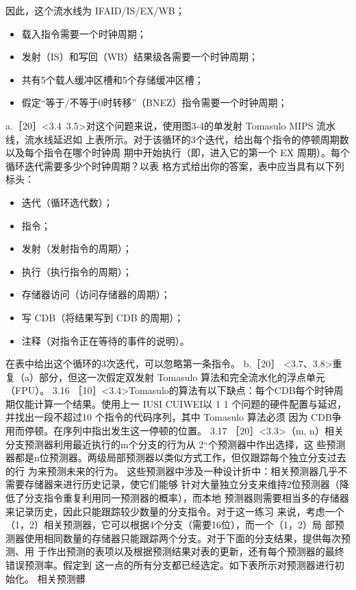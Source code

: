 因此，这个流水线为 IFAID/IS/EX/WB；
\begin{itemize}
    \item 载入指令需要一个时钟周期；
    \item 发射（IS）和写回（WB）结果级各需要一个时钟周期；
    \item 共有5个载人缓冲区槽和5个存储缓冲区槽；
    \item 假定“等于/不等于0时转移”（BNEZ）指令需要一个时钟周期；
\end{itemize}
a.［20］<3.4~3.5>对这个问题来说，使用图3-4的单发射 Tomasulo MIPS 流水线，流水线延迟如
上表所示。对于该循环的3个迭代，给出每个指令的停顿周期数以及每个指令在哪个时钟周
期中开始执行（即，进入它的第一个 EX 周期）。每个循环迭代需要多少个时钟周期？以表
格方式给出你的答案，表中应当具有以下列标头：
\begin{itemize}
    \item 迭代（循环选代数）；
    \item 指令；
    \item 发射（发射指令的周期）；
    \item 执行（执行指令的周期）；
    \item 存储器访问（访问存储器的周期）；
    \item 写 CDB（将结果写到 CDB 的周期）；
    \item 注释（对指令正在等待的事件的说明）。
\end{itemize}
在表中给出这个循环的3次迭代，可以忽略第一条指令。
b.［20］ <3.7、3.8>重复（a）部分，但这一次假定双发射 Tomasulo 算法和完全流水化的浮点单元（FPU）。
3.16 ［10］<3.4>Tomasulo的算法有以下缺点：每个CDB每个时钟周期仅能计算一个结果。使用上一
IUSI CUIWEI以
1 1
个问题的硬件配置与延迟，并找出一段不超过10 个指令的代码序列，其中 Tomasulo 算法必须
因为 CDB争用而停顿。在序列中指出发生这一停顿的位置。
3.17
［20］<3.3>（m, n）相关分支预测器利用最近执行的m个分支的行为从 2“个预测器中作出选择，这
些预测器都是n位预测器。两级局部预测器以类似方式工作，但仅跟踪每个独立分支过去的行
为来预测未来的行为。
这些预测器中涉及一种设计折中：相关预测器几乎不需要存储器来进行历史记录，使它们能够
针对大量独立分支来维持2位预测器（降低了分支指令重复利用同一预测器的概率），而本地
预测器则需要相当多的存储器来记录历史，因此只能跟踪较少数量的分支指令。对于这一练习
来说，考虑一个（1，2）相关预测器，它可以根据4个分支（需要16位），而一个（1，2）局
部预测器使用相同数量的存储器只能跟踪两个分支。对于下面的分支结果，提供每次预测、用
于作出预测的表项以及根据预测结果对表的更新，还有每个预测器的最终错误预测率。假定到
这一点的所有分支都已经选定。如下表所示对预测器进行初始化。
相关预测髒
